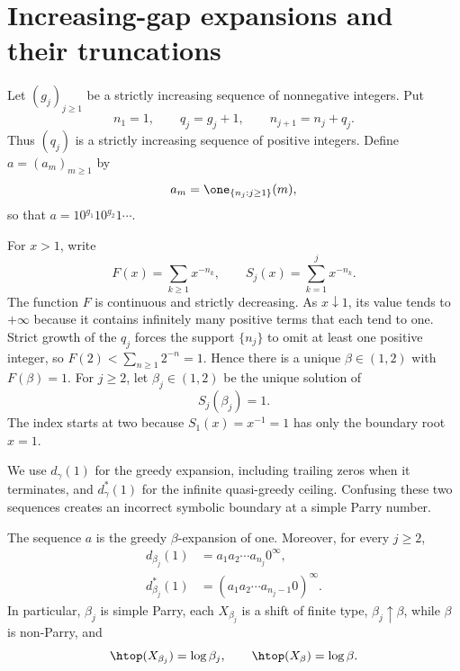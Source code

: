 \section{Increasing-gap expansions and their truncations}
\label{sec:setup}

Let $(g_j)_{j\geq1}$ be a strictly increasing sequence of nonnegative integers.  Put
\begin{equation}
 n_1=1,\qquad q_j=g_j+1,\qquad n_{j+1}=n_j+q_j.
 \label{eq:positions}
\end{equation}
Thus $(q_j)$ is a strictly increasing sequence of positive integers.  Define $a=(a_m)_{m\geq1}$ by
\[
 a_m=\one_{\{n_j:j\geq1\}}(m),
\]
so that $a=10^{g_1}10^{g_2}1\cdots$.

For $x>1$, write
\[
 F(x)=\sum_{k\geq1}x^{-n_k},\qquad
 S_j(x)=\sum_{k=1}^j x^{-n_k}.
\]
The function $F$ is continuous and strictly decreasing.  As $x\downarrow1$, its value tends to $+\infty$ because it contains infinitely many positive terms that each tend to one.  Strict growth of the $q_j$ forces the support $\{n_j\}$ to omit at least one positive integer, so
$F(2)<\sum_{n\geq1}2^{-n}=1$.  Hence there is a unique $\beta\in(1,2)$ with $F(\beta)=1$.  For $j\geq2$, let $\beta_j\in(1,2)$ be the unique solution of
\begin{equation}
 S_j(\beta_j)=1.
 \label{eq:truncated-root}
\end{equation}
The index starts at two because $S_1(x)=x^{-1}=1$ has only the boundary root $x=1$.

We use $d_\gamma(1)$ for the greedy expansion, including trailing zeros when it terminates, and $d_\gamma^*(1)$ for the infinite quasi-greedy ceiling.  Confusing these two sequences creates an incorrect symbolic boundary at a simple Parry number.

\begin{proposition}
\label{prop:realization}
The sequence $a$ is the greedy $\beta$-expansion of one.  Moreover, for every $j\geq2$,
\begin{align}
 d_{\beta_j}(1)&=a_1a_2\cdots a_{n_j}0^\infty,\label{eq:finite-greedy}\\
 d_{\beta_j}^*(1)&=(a_1a_2\cdots a_{n_j-1}0)^\infty.\label{eq:periodic-ceiling}
\end{align}
In particular, $\beta_j$ is simple Parry, each $X_{\beta_j}$ is a shift of finite type, $\beta_j\uparrow\beta$, while $\beta$ is non-Parry, and
\[
 \htop(X_{\beta_j})=\log\beta_j,
 \qquad
 \htop(X_\beta)=\log\beta.
\]
\end{proposition}

